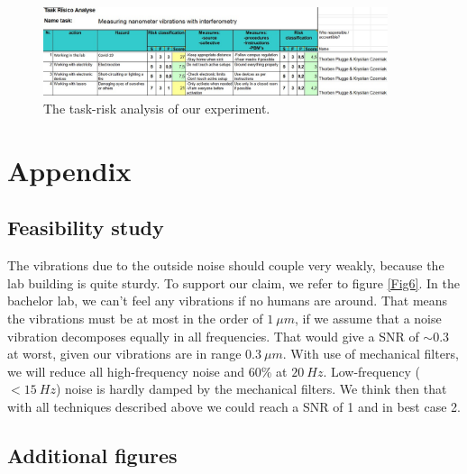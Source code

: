\documentclass[a4paper,11pt]{article} %
\begin{document}
\begin{figure}[H]\label{TRA}
  \centering
  \includegraphics[width=0.9\textwidth]{TRA.jpg}
  \caption{The task-risk analysis of our experiment.} 
\end{figure}

\section{Appendix}

\subsection{Feasibility study}\label{study}

The vibrations due to the outside noise should couple very weakly, because the lab building is quite sturdy. To support our claim, we refer to figure \ref{Fig6}. In the bachelor lab, we can't feel any vibrations if no humans are around. That means the vibrations must be at most in the order of $\SI{1}{\mu m}$, if we assume that a noise vibration decomposes equally in all frequencies. That would give a SNR of $\sim 0.3$ at worst, given our vibrations are in range $\SI{0.3}{\mu m}$. With use of mechanical filters, we will reduce all high-frequency noise and 60\% at $\SI{20}{Hz}$. Low-frequency ($<\SI{15}{Hz}$) noise is hardly damped by the mechanical filters. We think then that with all techniques described above we could reach a SNR of 1 and in best case 2.

\subsection{Additional figures}
\end{document}
